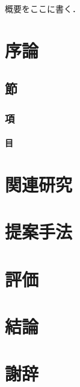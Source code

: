 \documentclass[a4paper,12pt]{jsarticle}
\date{平成xx年3月}
\begin{document}
\Front %
\MakeTitlePage

\begin{Abstract}
概要をここに書く．
\end{Abstract}

\TableOfContents

\Main %

\section{序論}

\subsection{節}

\subsubsection{項}

\paragraph{目}

\section{関連研究}

\section{提案手法}

\section{評価}

\section{結論}

\section*{謝辞}

\begin{thebibliography}{99}

\end{thebibliography}
\end{document}
